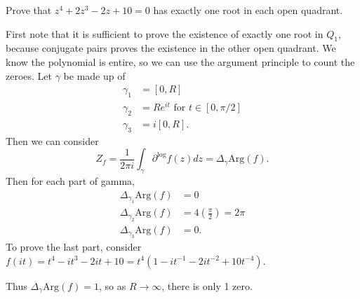 \documentclass[12pt]{article}
\begin{document}
\begin{statement}[12]
  Prove that $z^4+2z^3-2z+10=0$ has exactly one root in each open quadrant. 
\end{statement}
\begin{newproof}
  First note that it is sufficient to prove the existence of exactly one root in $Q_1$, because conjugate 
  pairs proves the existence in the other open quadrant. We know the polynomial is entire, so we can use the 
  argument principle to count the zeroes. Let $\gamma$ be made up of 
  \begin{align*}
    \gamma_1 &= [0,R] \\
    \gamma_2 &= Re^{it} \text{ for } t \in [0, \pi / 2] \\
    \gamma_ 3 &= i[0,R].
  \end{align*}
  Then we can consider 
  \begin{equation*}
    Z_f = \frac{1}{2\pi i} \int_{\gamma} \partial^{\log} f(z)dz = \Delta_{\gamma}\text{Arg}(f).
  \end{equation*}
  Then for each part of gamma, 
  \begin{align*}
    \Delta_{\gamma_1}\text{Arg}(f) &= 0 \\
    \Delta_{\gamma_2}\text{Arg}(f) &= 4(\frac{\pi}{2}) = 2\pi \\
    \Delta_{\gamma_3}\text{Arg}(f) &=0.
  \end{align*}
  To prove the last part, consider $f(it)=t^4-it^3-2it+10=t^4(1-it^{-1}-2it^{-2}+10t^{-4})$.
  \par Thus $\Delta_{\gamma}\text{Arg}(f)=1$, so as $R \to \infty$, there is only 1 zero. 
\end{newproof}

\end{document}
